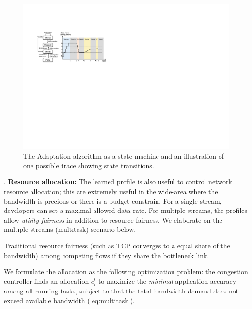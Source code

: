 \begin{figure}
  \centering
  \includegraphics[width=\columnwidth]{figures/cc.pdf}
  \caption{The Adaptation algorithm as a state machine and an illustration of
    one possible trace showing state transitions.}
  \label{fig:cc}
\end{figure}

%     

\vspace{1em}\noindent {}. \textbf{Resource allocation:}
The learned profile is also useful to control network resource allocation; this
are extremely useful in the wide-area where the bandwidth is precious or there
is a budget constrain. For a single stream, developers can set a maximal allowed
data rate. For multiple streams, the profiles allow \textit{utility fairness} in
addition to resource fairness. We elaborate on the multiple streams (multitask)
scenario below.

Traditional resource fairness (such as TCP converges to a equal share of the
bandwidth) among competing flows if they share the bottleneck link.


We formulate the allocation as the following optimization problem: the
congestion controller finds an allocation $c_i^t$ to maximize the
\textit{minimal} application accuracy among all running tasks, subject to that
the total bandwidth demand does not exceed available bandwidth
(\autoref{eq:multitask}).

